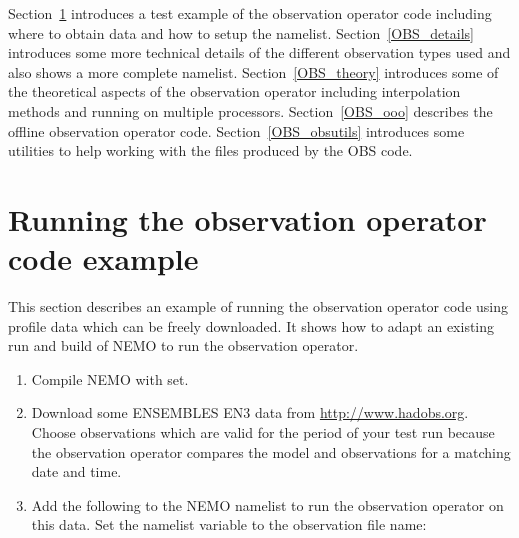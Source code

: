Section~\ref{OBS_example} introduces a test example of the observation operator code including
where to obtain data and how to setup the namelist. Section~\ref{OBS_details} introduces some
more technical details of the different observation types used and also shows a more complete
namelist. Section~\ref{OBS_theory} introduces some of the theoretical aspects of the observation
operator including interpolation methods and running on multiple processors.
Section~\ref{OBS_ooo} describes the offline observation operator code.
Section~\ref{OBS_obsutils} introduces some utilities to help working with the files
produced by the OBS code.

\section{Running the observation operator code example}
\label{OBS_example}

This section describes an example of running the observation operator code using
profile data which can be freely downloaded. It shows how to adapt an
existing run and build of NEMO to run the observation operator.

\begin{enumerate}
\item Compile NEMO with  set.

\item Download some ENSEMBLES EN3 data from 
\href{http://www.hadobs.org}{http://www.hadobs.org}. Choose observations which are
valid for the period of your test run because the observation operator compares
the model and observations for a matching date and time. 

\item Add the following to the NEMO namelist to run the observation
operator on this data. Set the  namelist variable to the
observation  file name:
\end{enumerate}


